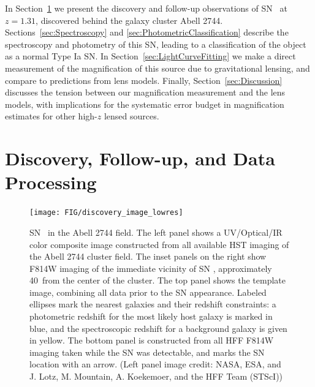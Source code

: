 In Section~\ref{sec:DiscoveryAndFollowup} we present the discovery and
follow-up observations of SN \tomas\ at $z=1.31$, discovered behind the
galaxy cluster Abell 2744.  Sections~\ref{sec:Spectroscopy}
and \ref{sec:PhotometricClassification} describe the spectroscopy and
photometry of this SN, leading to a classification of the object as a
normal Type Ia SN.  In Section~\ref{sec:LightCurveFitting} we make a
direct measurement of the magnification of this source due to
gravitational lensing, and compare to predictions from lens models.
Finally, Section~\ref{sec:Discussion} discusses the tension between
our magnification measurement and the lens models, with implications
for the systematic error budget in magnification estimates for other
high-$z$ lensed sources.


\section{Discovery, Follow-up, and Data Processing}
\label{sec:DiscoveryAndFollowup}

\begin{figure}
\begin{center}
\texttt{[image: FIG/discovery\_image\_lowres]}
\caption{  \label{fig:DiscoveryImage} 
SN \tomas\ in the Abell 2744 field.  The left panel shows a
UV/Optical/IR color composite image constructed from all available HST
imaging of the Abell 2744 cluster field.  The inset panels on the right
show F814W imaging of the immediate vicinity of SN \tomas,
approximately 40\arcsec\ from the center of the cluster. The top panel
shows the template image, combining all data prior to the SN
appearance.  Labeled ellipses mark the nearest galaxies and their
redshift constraints: a photometric redshift for the most likely host
galaxy is marked in blue, and the spectroscopic redshift for a
background galaxy is given in yellow. The bottom panel is constructed
from all HFF F814W imaging taken while the SN was detectable, and
marks the SN location with an arrow.  (Left panel image credit: NASA,
ESA, and J. Lotz, M. Mountain, A. Koekemoer, and the HFF Team (STScI))
}
\end{center}
\end{figure}


